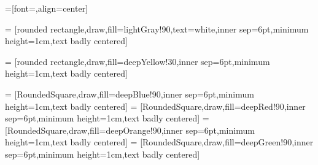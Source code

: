 \usetikzlibrary{backgrounds}





=[font=\sffamily,align=center]

\newcommand{\fillOpacity}{90}
\newcommand{\fillOpacityTwo}{30}
\newcommand{\fillOpacityThree}{10}

\newcommand{\compShape}{rectangle}
\newcommand{\groupShape}{RoundedSquare}
\newcommand{\funcShape}{chamfered rectangle}
\newcommand{\procShape}{rounded rectangle}

\newcommand{\explicitColor}{deepGreen}
\newcommand{\customColor}{deepYellow}
\newcommand{\implicitColor}{deepCyan}
\newcommand{\optimizationColor}{lightGray}
\newcommand{\fluidColor}{deepBlue}
\newcommand{\solidColor}{deepRed}
\newcommand{\propulsionColor}{deepYellow}
\newcommand{\FuncFluidColor}{deepBlue}
\newcommand{\FuncSolidColor}{deepRed}

 = [\procShape,draw,fill=\optimizationColor!\fillOpacity,text=white,inner sep=6pt,minimum height=1cm,text badly centered]

 = [\procShape,draw,fill=deepYellow!\fillOpacityTwo,inner sep=6pt,minimum height=1cm,text badly centered]

 = [\groupShape,draw,fill=deepBlue!\fillOpacity,inner sep=6pt,minimum height=1cm,text badly centered]
 = [\groupShape,draw,fill=deepRed!\fillOpacity,inner sep=6pt,minimum height=1cm,text badly centered]
 = [\groupShape,draw,fill=deepOrange!\fillOpacity,inner sep=6pt,minimum height=1cm,text badly centered]
 = [\groupShape,draw,fill=deepGreen!\fillOpacity,inner sep=6pt,minimum height=1cm,text badly centered]


